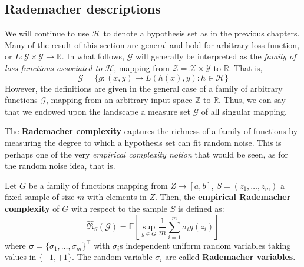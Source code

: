 \subsection{Rademacher descriptions}
We will continue to use $\mathcal{H}$ to denote a hypothesis set as in the previous chapters. Many of the result of this section are general and hold for arbitrary loss function, or $L: \mathcal{Y}\times \mathcal{Y}\to \mathbb{R}$. In what follows, $\mathcal{G}$ will generally be interpreted as the \textit{family of loss functions associated to $\mathcal{H}$}, mapping from $\mathcal{Z}=\mathcal{X}\times\mathcal{Y}$ to $\mathbb{R}$. That is, \begin{equation*}
    \mathcal{G} = \{g: (x,y)\mapsto L(h(x),y): h\in \mathcal{H}\}
\end{equation*}
However, the definitions are given in the general case of a family of arbitrary functions $\mathcal{G}$, mapping from an arbitrary input space $\mathbb{Z}$ to $\mathbb{R}$. Thus, we can say that we endowed upon the landscape a measure set $\mathcal{G}$ of all singular mapping. 

The \textbf{Rademacher complexity} captures the richness of a family of functions by measuring the degree to which a hypothesis set can fit random noise. This is perhaps one of the very \textit{empirical complexity notion} that would be seen, as for the random noise idea, that is. 

Let $G$ be a family of functions mapping from $Z\to [a,b]$, $S=(z_1,\dots, z_m)$ a fixed sample of size $m$ with elements in $Z$. Then, the \textbf{empirical Rademacher complexity} of $G$ with respect to the sample $S$ is defined as:
\begin{equation*}
    \hat{\mathfrak{R}}_S (\mathcal{G}) = \mathbb{E} \left[ \sup_{g\in G} \frac{1}{m} \sum^{m}_{i=1} \sigma_i g(z_i) \right]
\end{equation*}
where $\bm{\sigma}=\{\sigma_1,\dots,\sigma_m\}^{\top}$ with $\sigma_i$s independent uniform random variables taking values in $\{-1,+1\}$. The random variable $\sigma_i$ are called \textbf{Rademacher variables}. 

